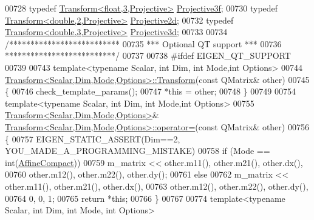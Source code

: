 \begin{DoxyCode}
00728 \textcolor{keyword}{typedef} \hyperlink{group___geometry___module_class_eigen_1_1_transform}{Transform<float,3,Projective>} \hyperlink{group___geometry___module_gab14804071b7486b6666f3d324475a478}{Projective3f};
00730 \textcolor{keyword}{typedef} \hyperlink{group___geometry___module_class_eigen_1_1_transform}{Transform<double,2,Projective>} 
      \hyperlink{group___geometry___module_ga461bbe55fc07888761bcda98aea0366d}{Projective2d};
00732 \textcolor{keyword}{typedef} \hyperlink{group___geometry___module_class_eigen_1_1_transform}{Transform<double,3,Projective>} 
      \hyperlink{group___geometry___module_gab9cec8c457da930391eb73370e07aaae}{Projective3d};
00733 
00734 \textcolor{comment}{/**************************}
00735 \textcolor{comment}{*** Optional QT support ***}
00736 \textcolor{comment}{**************************/}
00737 
00738 \textcolor{preprocessor}{#ifdef EIGEN\_QT\_SUPPORT}
00739 
00743 \textcolor{keyword}{template}<\textcolor{keyword}{typename} Scalar, \textcolor{keywordtype}{int} Dim, \textcolor{keywordtype}{int} Mode,\textcolor{keywordtype}{int} Options>
00744 \hyperlink{group___geometry___module_a79b94ccee0f7871610fa2fa084e0fd59}{Transform<Scalar,Dim,Mode,Options>::Transform}(\textcolor{keyword}{const} QMatrix& 
      other)
00745 \{
00746   check\_template\_params();
00747   *\textcolor{keyword}{this} = other;
00748 \}
00749 
00754 \textcolor{keyword}{template}<\textcolor{keyword}{typename} Scalar, \textcolor{keywordtype}{int} Dim, \textcolor{keywordtype}{int} Mode,\textcolor{keywordtype}{int} Options>
00755 \hyperlink{group___geometry___module_class_eigen_1_1_transform}{Transform<Scalar,Dim,Mode,Options>}& 
      \hyperlink{group___geometry___module_class_eigen_1_1_transform}{Transform<Scalar,Dim,Mode,Options>::operator=}(\textcolor{keyword}{const} QMatrix& 
      other)
00756 \{
00757   EIGEN\_STATIC\_ASSERT(Dim==2, YOU\_MADE\_A\_PROGRAMMING\_MISTAKE)
00758   \textcolor{keywordflow}{if} (Mode == \textcolor{keywordtype}{int}(\hyperlink{group__enums_ggaee59a86102f150923b0cac6d4ff05107aa30a06b60d218b709020972df47de2b0}{AffineCompact}))
00759     m\_matrix << other.m11(), other.m21(), other.dx(),
00760                 other.m12(), other.m22(), other.dy();
00761   \textcolor{keywordflow}{else}
00762     m\_matrix << other.m11(), other.m21(), other.dx(),
00763                 other.m12(), other.m22(), other.dy(),
00764                 0, 0, 1;
00765   \textcolor{keywordflow}{return} *\textcolor{keyword}{this};
00766 \}
00767 
00774 \textcolor{keyword}{template}<\textcolor{keyword}{typename} Scalar, \textcolor{keywordtype}{int} Dim, \textcolor{keywordtype}{int} Mode, \textcolor{keywordtype}{int} Options>

\end{DoxyCode}
